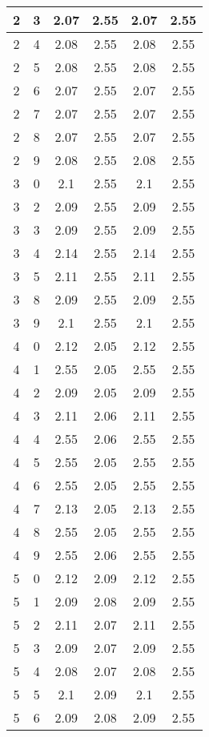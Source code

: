 \begin{longtable}{|c|c||c||c||c|c|}
	2 & 3 & 2.07 & 2.55 & 2.07 & 2.55 \\ \hline
	2 & 4 & 2.08 & 2.55 & 2.08 & 2.55 \\ \hline
	2 & 5 & 2.08 & 2.55 & 2.08 & 2.55 \\ \hline
	2 & 6 & 2.07 & 2.55 & 2.07 & 2.55 \\ \hline
	2 & 7 & 2.07 & 2.55 & 2.07 & 2.55 \\ \hline
	2 & 8 & 2.07 & 2.55 & 2.07 & 2.55 \\ \hline
	2 & 9 & 2.08 & 2.55 & 2.08 & 2.55 \\ \hline
	3 & 0 & 2.1 & 2.55 & 2.1 & 2.55 \\ \hline
	3 & 2 & 2.09 & 2.55 & 2.09 & 2.55 \\ \hline
	3 & 3 & 2.09 & 2.55 & 2.09 & 2.55 \\ \hline
	3 & 4 & 2.14 & 2.55 & 2.14 & 2.55 \\ \hline
	3 & 5 & 2.11 & 2.55 & 2.11 & 2.55 \\ \hline
	3 & 8 & 2.09 & 2.55 & 2.09 & 2.55 \\ \hline
	3 & 9 & 2.1 & 2.55 & 2.1 & 2.55 \\ \hline
	4 & 0 & 2.12 & 2.05 & 2.12 & 2.55 \\ \hline
	4 & 1 & 2.55 & 2.05 & 2.55 & 2.55 \\ \hline
	4 & 2 & 2.09 & 2.05 & 2.09 & 2.55 \\ \hline
	4 & 3 & 2.11 & 2.06 & 2.11 & 2.55 \\ \hline
	4 & 4 & 2.55 & 2.06 & 2.55 & 2.55 \\ \hline
	4 & 5 & 2.55 & 2.05 & 2.55 & 2.55 \\ \hline
	4 & 6 & 2.55 & 2.05 & 2.55 & 2.55 \\ \hline
	4 & 7 & 2.13 & 2.05 & 2.13 & 2.55 \\ \hline
	4 & 8 & 2.55 & 2.05 & 2.55 & 2.55 \\ \hline
	4 & 9 & 2.55 & 2.06 & 2.55 & 2.55 \\ \hline
	5 & 0 & 2.12 & 2.09 & 2.12 & 2.55 \\ \hline
	5 & 1 & 2.09 & 2.08 & 2.09 & 2.55 \\ \hline
	5 & 2 & 2.11 & 2.07 & 2.11 & 2.55 \\ \hline
	5 & 3 & 2.09 & 2.07 & 2.09 & 2.55 \\ \hline
	5 & 4 & 2.08 & 2.07 & 2.08 & 2.55 \\ \hline
	5 & 5 & 2.1 & 2.09 & 2.1 & 2.55 \\ \hline
	5 & 6 & 2.09 & 2.08 & 2.09 & 2.55 \\ \hline

\end{longtable}

